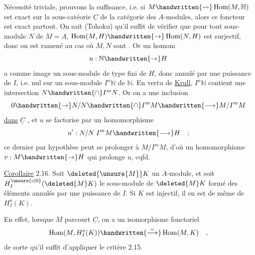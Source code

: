 Nécessité triviale, prouvons la suffisance, i.e. si $M\handwritten{\leadsto}\operatorname{Hom}(M,\mathbb H)$ est
exact sur la sous-catéorie $\underline C$ de la catégorie des $A$-modules, alors ce
foncteur est exact partout. On sait (Tohoku) qu'il suffit de  vérifier
que pour tout sous-module $N$ de $M=A$, $\operatorname{Hom}(M,H)\handwritten{\to}\operatorname{Hom}(N,H)$ est surjectif,
donc on est ramené au cas où $M,N$ sont . Or un homom
\[
u:\mathbb N\handwritten{\to}H
\]
a comme image un sous-module de type fini de $H$, donc annulé par une
puissance de $I$, i.e.  nul sur un sous-module $I^n\mathbb N$ de $\mathbb N$. En vertu de \uline{Krull},
$I^n\mathbb N$ contient une intersection $N\handwritten{\cap}I^mN$. Or on a une inclusion
\[
0\handwritten{\to}N/N\handwritten{\cap}I^mM\handwritten{\longrightarrow}M/I^mM
\]
\uline{dans} $\underline C$ , et $u$ se factorise par un homomorphisme
\[
u':N/N\; I^mM\handwritten{\longrightarrow}H\quad;
\]
ce dernier par hypothèse peut se prolonger à $M/I^mM$, d'où un homomorphisme
$v:M\handwritten{\to}H$ qui prolonge $u$, cqfd.

\uline{Corollaire} 2.16. Soit $\deleted{\unsure{M}}K$ un $A$-module, et soit $H_I^{\unsure{o|0}}(\deleted{M}K)$ le sous-module de $\deleted{M}K$
formé des éléments annulés par une puissance de $I$. Si $K$ est injectif, il
en est de même de $H_I^o(K)$.

En effet, lorsque $M$ parcourt $\underline C$, on a un isomorphisme fonctoriel
\[
\operatorname{Hom}(M,H_I^o(K))\handwritten{\overset{\sim}{\longrightarrow}}\operatorname{Hom}(M,K)\quad,
\]
de sorte qu'il suffit d'appliquer le critère 2.15.

